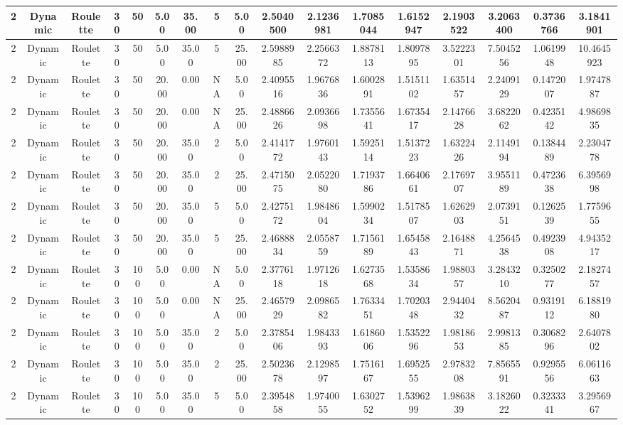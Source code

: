 \begin{longtable}{ | c | c | c | c | c | c | c | c | c | c | c | c | c | c | c | c | c | }
	\hline
	2	&	Dynamic	&	Roulette	&	30	&	50	&	5.00	&	35.00	&	5	&	5.00	&	2.5040500	&	2.1236981	&	1.7085044	&	1.6152947	&	2.1903522	&	3.2063400	&	0.3736766	&	3.1841901 \\
	\hline
	2	&	Dynamic	&	Roulette	&	30	&	50	&	5.00	&	35.00	&	5	&	25.00	&	2.5988985	&	2.2566372	&	1.8878113	&	1.8097895	&	3.5222301	&	7.5045256	&	1.0619948	&	10.4645923 \\
	\hline
	2	&	Dynamic	&	Roulette	&	30	&	50	&	20.00	&	0.00	&	NA	&	5.00	&	2.4095516	&	1.9676836	&	1.6002891	&	1.5151102	&	1.6351457	&	2.2409129	&	0.1472007	&	1.9747887 \\
	\hline
	2	&	Dynamic	&	Roulette	&	30	&	50	&	20.00	&	0.00	&	NA	&	25.00	&	2.4886626	&	2.0936698	&	1.7355641	&	1.6735417	&	2.1476628	&	3.6822062	&	0.4235142	&	4.9869835 \\
	\hline
	2	&	Dynamic	&	Roulette	&	30	&	50	&	20.00	&	35.00	&	2	&	5.00	&	2.4141772	&	1.9760143	&	1.5925114	&	1.5137223	&	1.6322426	&	2.1149194	&	0.1384489	&	2.2304778 \\
	\hline
	2	&	Dynamic	&	Roulette	&	30	&	50	&	20.00	&	35.00	&	2	&	25.00	&	2.4715075	&	2.0522080	&	1.7193786	&	1.6640661	&	2.1769707	&	3.9551189	&	0.4723638	&	6.3956998 \\
	\hline
	2	&	Dynamic	&	Roulette	&	30	&	50	&	20.00	&	35.00	&	5	&	5.00	&	2.4275172	&	1.9848604	&	1.5990234	&	1.5178507	&	1.6262903	&	2.0739151	&	0.1262539	&	1.7759655 \\
	\hline
	2	&	Dynamic	&	Roulette	&	30	&	50	&	20.00	&	35.00	&	5	&	25.00	&	2.4688834	&	2.0558759	&	1.7156189	&	1.6545843	&	2.1648871	&	4.2564538	&	0.4923908	&	4.9435217 \\
	\hline
	2	&	Dynamic	&	Roulette	&	30	&	100	&	5.00	&	0.00	&	NA	&	5.00	&	2.3776118	&	1.9712618	&	1.6273568	&	1.5358634	&	1.9880357	&	3.2843210	&	0.3250277	&	2.1827457 \\
	\hline
	2	&	Dynamic	&	Roulette	&	30	&	100	&	5.00	&	0.00	&	NA	&	25.00	&	2.4657929	&	2.0986582	&	1.7633451	&	1.7020348	&	2.9440432	&	8.5620487	&	0.9319112	&	6.1881980 \\
	\hline
	2	&	Dynamic	&	Roulette	&	30	&	100	&	5.00	&	35.00	&	2	&	5.00	&	2.3785406	&	1.9843393	&	1.6186006	&	1.5352296	&	1.9818653	&	2.9981385	&	0.3068296	&	2.6407802 \\
	\hline
	2	&	Dynamic	&	Roulette	&	30	&	100	&	5.00	&	35.00	&	2	&	25.00	&	2.5023678	&	2.1298597	&	1.7516167	&	1.6952555	&	2.9783208	&	7.8565591	&	0.9295556	&	6.0611663 \\
	\hline
	2	&	Dynamic	&	Roulette	&	30	&	100	&	5.00	&	35.00	&	5	&	5.00	&	2.3954858	&	1.9740055	&	1.6302752	&	1.5396299	&	1.9863839	&	3.1826022	&	0.3233341	&	3.2956967 \\

\end{longtable}
